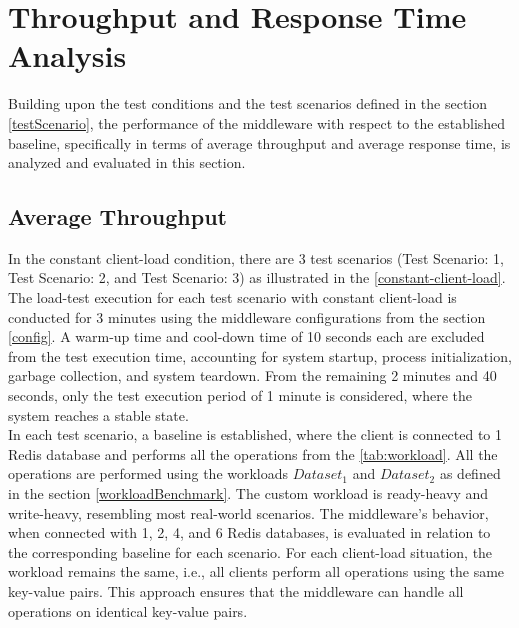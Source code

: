 \section{Throughput and Response Time Analysis}
\label{throughputAnalysis}

Building upon the test conditions and the test scenarios defined in the section \ref{testScenario}, the performance of the middleware with respect to the established baseline, specifically in terms of average throughput and average response time, is analyzed and evaluated in this section. 

\subsection*{\textbf{Average Throughput}}

In the constant client-load condition, there are 3 test scenarios (Test Scenario: 1, Test Scenario: 2, and Test Scenario: 3) as illustrated in the \cref{constant-client-load}. The load-test execution for each test scenario with constant client-load is conducted for 3 minutes using the middleware configurations from the section \ref{config}. A warm-up time and cool-down time of 10 seconds each are excluded from the test execution time, accounting for system startup, process initialization, garbage collection, and system teardown. From the remaining 2 minutes and 40 seconds, only the test execution period of 1 minute is considered, where the system reaches a stable state. \\

\noindent In each test scenario, a baseline is established, where the client is connected to 1 Redis database and performs all the operations from the \cref{tab:workload}. All the operations are performed using the workloads $Dataset_{1}$ and $Dataset_{2}$ as defined in the section \ref{workloadBenchmark}. The custom workload is ready-heavy and write-heavy, resembling most real-world scenarios. The middleware’s behavior, when connected with 1, 2, 4, and 6 Redis databases, is evaluated in relation to the corresponding baseline for each scenario. For each client-load situation, the workload remains the same, i.e., all clients perform all operations using the same key-value pairs. This approach ensures that the middleware can handle all operations on identical key-value pairs. \\

